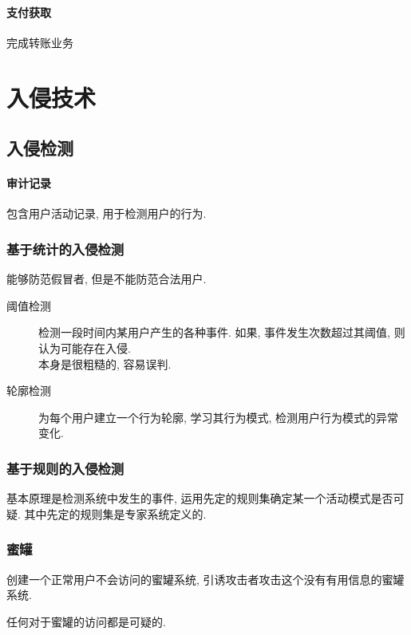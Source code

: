 \documentclass{ctexart}
\begin{document}
\paragraph{支付获取}
    完成转账业务

\section{入侵技术}
\subsection{入侵检测}
\paragraph{审计记录} 包含用户活动记录, 用于检测用户的行为.
\subsubsection{基于统计的入侵检测}
    能够防范假冒者, 但是不能防范合法用户.\par
    \begin{description}
        \item[阈值检测] 检测一段时间内某用户产生的各种事件.
            如果, 事件发生次数超过其阈值, 则认为可能存在入侵.\\
            本身是很粗糙的, 容易误判.
        \item[轮廓检测] 为每个用户建立一个行为轮廓, 学习其行为模式,
            检测用户行为模式的异常变化.
    \end{description}
\subsubsection{基于规则的入侵检测}
    基本原理是检测系统中发生的事件,
    运用先定的规则集确定某一个活动模式是否可疑.
    其中先定的规则集是专家系统定义的.
\subsubsection{蜜罐}
    创建一个正常用户不会访问的蜜罐系统, 
    引诱攻击者攻击这个没有有用信息的蜜罐系统.\par
    任何对于蜜罐的访问都是可疑的.
\end{document}
